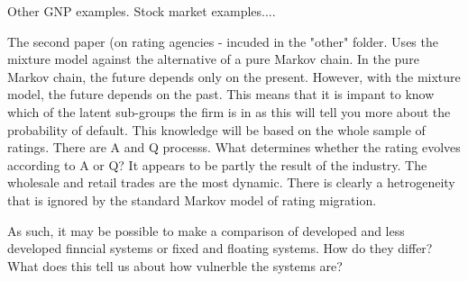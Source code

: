 \documentclass[12pt, a4paper, oneside]{article} %
\begin{document}


Other GNP examples.  Stock market examples....

The second paper (on rating agencies - incuded in the "other" folder.  Uses the mixture model against the alternative of a pure Markov chain. In the pure Markov chain, the future depends only on the present.  However, with the mixture model, the future depends on the past.  This means that it is impant to know which of the latent sub-groups the firm is in as this will tell you more about the probability of default.  This knowledge will be based on the whole sample of ratings. There are A and Q processs.  What determines whether the rating evolves according to A or Q?  It appears to be partly the result of the industry.  The wholesale and retail trades are the most dynamic. There is clearly a hetrogeneity that is ignored by the standard Markov model of rating migration. 

As such, it may be possible to make a comparison of developed and less developed finncial systems or fixed and floating systems.  How do they differ?  What does this tell us about how vulnerble the systems are?  



\end{document}
